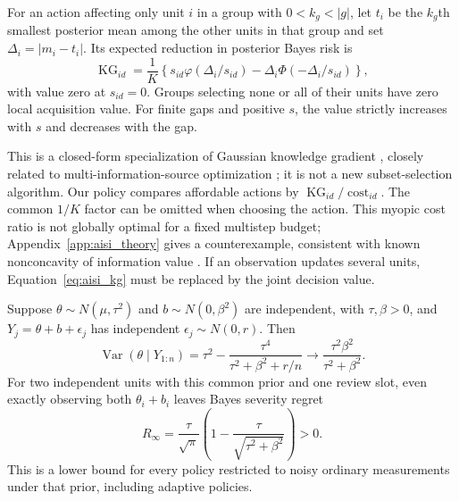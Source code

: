 \begin{proposition}
\label{prop:aisi_kg}
For an action affecting only unit $i$ in a group with $0<k_g<|g|$, let
$t_i$ be the $k_g$th smallest posterior mean among the other units in that
group and set $\Delta_i=|m_i-t_i|$. Its expected reduction in posterior
Bayes risk is
\begin{equation}
 \operatorname{KG}_{id}=\frac{1}{K}
 \left\{s_{id}\varphi(\Delta_i/s_{id})-
         \Delta_i\Phi(-\Delta_i/s_{id})\right\},
 \label{eq:aisi_kg}
\end{equation}
with value zero at $s_{id}=0$. Groups selecting none or all of their units
have zero local acquisition value. For finite gaps and positive $s$, the
value strictly increases with $s$ and decreases with the gap.
\end{proposition}

This is a closed-form specialization of Gaussian knowledge gradient
\citep{frazier2008kg,frazier2009correlated}, closely related to
multi-information-source optimization \citep{poloczek2017miso}; it is not
a new subset-selection algorithm. Our policy compares affordable actions
by $\operatorname{KG}_{id}/\operatorname{cost}_{id}$. The common $1/K$
factor can be omitted when choosing the action. This myopic cost ratio is
not globally optimal for a fixed multistep budget; Appendix~\ref{app:aisi_theory}
gives a counterexample, consistent with known nonconcavity of information
value \citep{frazier2010paradoxes}. If an observation updates several units,
Equation~\eqref{eq:aisi_kg} must be replaced by the joint decision value.

\begin{proposition}
\label{prop:aisi_floor}
Suppose $\theta\sim N(\mu,\tau^2)$ and $b\sim N(0,\beta^2)$ are independent,
with $\tau,\beta>0$, and $Y_j=\theta+b+\epsilon_j$ has independent
$\epsilon_j\sim N(0,r)$. Then
\begin{equation}
 \operatorname{Var}(\theta\mid Y_{1:n})
 =\tau^2-\frac{\tau^4}{\tau^2+\beta^2+r/n}
 \longrightarrow \frac{\tau^2\beta^2}{\tau^2+\beta^2}.
 \label{eq:aisi_level_floor}
\end{equation}
For two independent units with this common prior and one review slot, even
exactly observing both $\theta_i+b_i$ leaves Bayes severity regret
\begin{equation}
 R_\infty=\frac{\tau}{\sqrt{\pi}}
          \left(1-\frac{\tau}{\sqrt{\tau^2+\beta^2}}\right)>0.
 \label{eq:aisi_selection_floor}
\end{equation}
This is a lower bound for every policy restricted to noisy ordinary
measurements under that prior, including adaptive policies.
\end{proposition}


